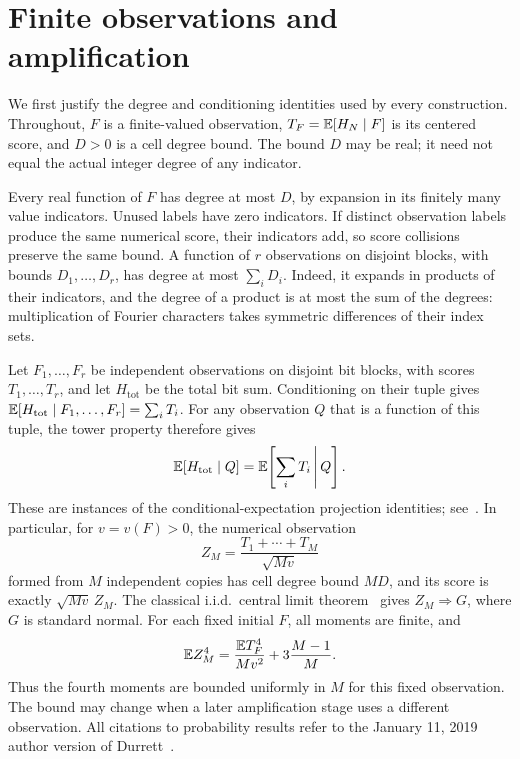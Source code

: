 \section{Finite observations and amplification}\label{sec:observations}

We first justify the degree and conditioning identities used by every
construction. Throughout, \(F\) is a finite-valued observation,
\(T_F=\mathbb E[H_N\mid F]\) is its centered score, and \(D>0\) is a cell
degree bound. The bound \(D\) may be real; it need not equal the actual
integer degree of any indicator.

Every real function of \(F\) has degree at most \(D\), by expansion in
its finitely many value indicators. Unused labels have zero indicators.
If distinct observation labels produce the same numerical score, their
indicators add, so score collisions preserve the same bound. A function of \(r\) observations on
disjoint blocks, with bounds \(D_1,\ldots,D_r\), has degree at most
\(\sum_iD_i\). Indeed, it expands in products of their indicators, and
the degree of a product is at most the sum of the degrees: multiplication
of Fourier characters takes symmetric differences of their index sets.

Let \(F_1,\ldots,F_r\) be independent observations on disjoint bit
blocks, with scores \(T_1,\ldots,T_r\), and let \(H_{\mathrm{tot}}\)
be the total bit sum. Conditioning on their tuple gives
\(\mathbb E[H_{\mathrm{tot}}\mid F_1,\ldots,F_r]=\sum_iT_i\).
For any observation \(Q\) that is a function of this tuple, the tower
property therefore gives
\[
 \mathbb E[H_{\mathrm{tot}}\mid Q]=\mathbb E\!\left[\sum_iT_i\,\middle|\,Q\right].
\]
These are instances of the conditional-expectation projection identities;
see~\cite[Theorems~4.1.13 and 4.1.15]{Durrett}. In particular, for
\(v=v(F)>0\), the numerical observation
\begin{equation}\label{eq:averaging}
 Z_M=\frac{T_1+\cdots+T_M}{\sqrt{Mv}}
\end{equation}
formed from \(M\) independent copies has cell degree bound \(MD\), and
its score is exactly \(\sqrt{Mv}\,Z_M\).
The classical i.i.d.\ central limit theorem~\cite[Theorem~3.4.1]{Durrett} gives
\(Z_M\Rightarrow G\), where \(G\) is standard normal. For each fixed
initial \(F\), all moments are finite, and
\begin{equation}\label{eq:fourth}
 \mathbb E Z_M^4=\frac{\mathbb E T_F^4}{Mv^2}+3\frac{M-1}{M}.
\end{equation}
Thus the fourth moments are bounded uniformly in \(M\) for this fixed
observation. The bound may change when a later amplification stage
uses a different observation.
All citations to probability results refer to the January 11, 2019 author
version of Durrett~\cite{Durrett}.


